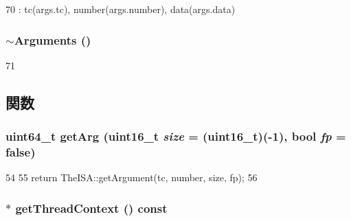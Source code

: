 \begin{DoxyCode}
70         : tc(args.tc), number(args.number), data(args.data) {}
\end{DoxyCode}
\hypertarget{classArguments_a9a08f8f7637c56dac7715c06a8470a1f}{
\subsubsection[{$\sim$Arguments}]{\setlength{\rightskip}{0pt plus 5cm}$\sim${\bf Arguments} ()}}
\label{classArguments_a9a08f8f7637c56dac7715c06a8470a1f}



\begin{DoxyCode}
71 {}
\end{DoxyCode}


\subsection{関数}
\hypertarget{classArguments_a02bee508af9a5d0695592b77fce0eda4}{
\subsubsection[{getArg}]{\setlength{\rightskip}{0pt plus 5cm}uint64\_\-t getArg (uint16\_\-t {\em size} = {\ttfamily (uint16\_\-t)(-\/1)}, \/  bool {\em fp} = {\ttfamily false})}}
\label{classArguments_a02bee508af9a5d0695592b77fce0eda4}



\begin{DoxyCode}
54 {
55     return TheISA::getArgument(tc, number, size, fp);
56 }
\end{DoxyCode}
\hypertarget{classArguments_a9010d7ea2c6add6308ebc3e34917ff00}{
\subsubsection[{getThreadContext}]{$\ast$ getThreadContext () const}}
\label{classArguments_a9010d7ea2c6add6308ebc3e34917ff00}



